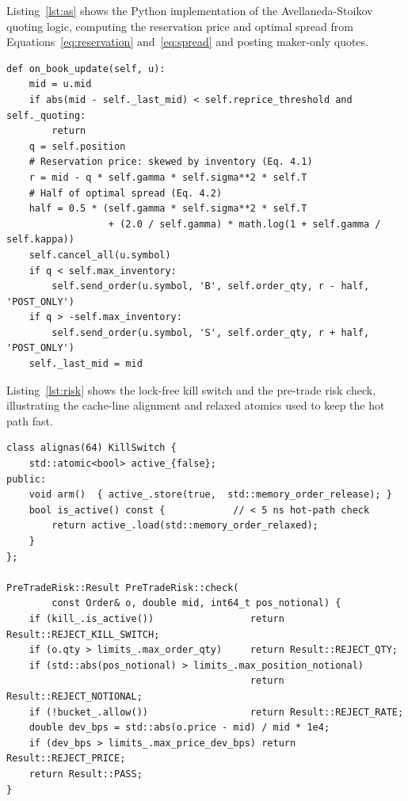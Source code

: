 \documentclass[12pt,oneside,a4paper]{report}
\begin{document}
Listing~\ref{lst:as} shows the Python implementation of the Avellaneda-Stoikov quoting logic, computing the reservation price and optimal spread from Equations~\ref{eq:reservation} and~\ref{eq:spread} and posting maker-only quotes.

\begin{lstlisting}[style=pystyle,caption={Avellaneda-Stoikov reservation price and optimal spread},label={lst:as}]
def on_book_update(self, u):
    mid = u.mid
    if abs(mid - self._last_mid) < self.reprice_threshold and self._quoting:
        return
    q = self.position
    # Reservation price: skewed by inventory (Eq. 4.1)
    r = mid - q * self.gamma * self.sigma**2 * self.T
    # Half of optimal spread (Eq. 4.2)
    half = 0.5 * (self.gamma * self.sigma**2 * self.T
                  + (2.0 / self.gamma) * math.log(1 + self.gamma / self.kappa))
    self.cancel_all(u.symbol)
    if q < self.max_inventory:
        self.send_order(u.symbol, 'B', self.order_qty, r - half, 'POST_ONLY')
    if q > -self.max_inventory:
        self.send_order(u.symbol, 'S', self.order_qty, r + half, 'POST_ONLY')
    self._last_mid = mid
\end{lstlisting}

Listing~\ref{lst:risk} shows the lock-free kill switch and the pre-trade risk check, illustrating the cache-line alignment and relaxed atomics used to keep the hot path fast.

\begin{lstlisting}[style=cppstyle,caption={Lock-free kill switch and pre-trade risk check},label={lst:risk}]
class alignas(64) KillSwitch {
    std::atomic<bool> active_{false};
public:
    void arm()  { active_.store(true,  std::memory_order_release); }
    bool is_active() const {            // < 5 ns hot-path check
        return active_.load(std::memory_order_relaxed);
    }
};

PreTradeRisk::Result PreTradeRisk::check(
        const Order& o, double mid, int64_t pos_notional) {
    if (kill_.is_active())                 return Result::REJECT_KILL_SWITCH;
    if (o.qty > limits_.max_order_qty)     return Result::REJECT_QTY;
    if (std::abs(pos_notional) > limits_.max_position_notional)
                                           return Result::REJECT_NOTIONAL;
    if (!bucket_.allow())                  return Result::REJECT_RATE;
    double dev_bps = std::abs(o.price - mid) / mid * 1e4;
    if (dev_bps > limits_.max_price_dev_bps) return Result::REJECT_PRICE;
    return Result::PASS;
}
\end{lstlisting}
\end{document}
